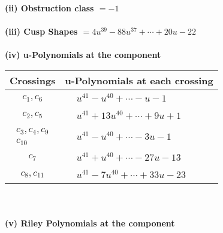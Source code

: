 \documentclass[1p]{elsarticle_modified}
\theoremstyle{definition}
\begin{document}
\flushleft \textbf{(ii) Obstruction class $= -1$}\\~\\
\flushleft \textbf{(iii) Cusp Shapes $= 4 u^{39}-88 u^{37}+\cdots+20 u-22$}\\~\\
\newpage\renewcommand{\arraystretch}{1}
\flushleft \textbf{(iv) u-Polynomials at the component}\newline \\
\begin{tabular}{m{50pt}|m{274pt}}
Crossings & \hspace{64pt}u-Polynomials at each crossing \\
\hline $$\begin{aligned}c_{1},c_{6}\end{aligned}$$&$\begin{aligned}
&u^{41}- u^{40}+\cdots- u-1
\end{aligned}$\\
\hline $$\begin{aligned}c_{2},c_{5}\end{aligned}$$&$\begin{aligned}
&u^{41}+13 u^{40}+\cdots+9 u+1
\end{aligned}$\\
\hline $$\begin{aligned}c_{3},c_{4},c_{9}\\c_{10}\end{aligned}$$&$\begin{aligned}
&u^{41}- u^{40}+\cdots-3 u-1
\end{aligned}$\\
\hline $$\begin{aligned}c_{7}\end{aligned}$$&$\begin{aligned}
&u^{41}+u^{40}+\cdots-27 u-13
\end{aligned}$\\
\hline $$\begin{aligned}c_{8},c_{11}\end{aligned}$$&$\begin{aligned}
&u^{41}-7 u^{40}+\cdots+33 u-23
\end{aligned}$\\
\hline
\end{tabular}\\~\\
\newpage\renewcommand{\arraystretch}{1}
\flushleft \textbf{(v) Riley Polynomials at the component}\newline \\
\end{document}
